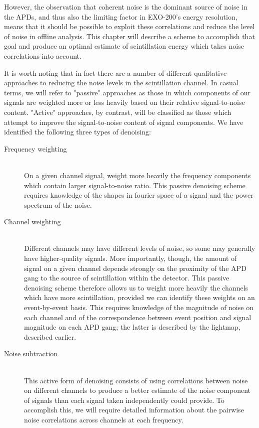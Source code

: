 However, the observation that coherent noise is the dominant source of noise in the APDs, and thus also the limiting factor in EXO-200's energy resolution, means that it should be possible to exploit these correlations and reduce the level of noise in offline analysis.  This chapter will describe a scheme to accomplish that goal and produce an optimal estimate of scintillation energy which takes noise correlations into account.

It is worth noting that in fact there are a number of different qualitative approaches to reducing the noise levels in the scintillation channel.  In casual terms, we will refer to "passive" approaches as those in which components of our signals are weighted more or less heavily based on their relative signal-to-noise content.  "Active" approaches, by contrast, will be classified as those which attempt to improve the signal-to-noise content of signal components.  We have identified the following three types of denoising:
\begin{description}
\item[Frequency weighting] \hfill \\
On a given channel signal, weight more heavily the frequency components which contain larger signal-to-noise ratio.  This passive denoising scheme requires knowledge of the shapes in fourier space of a signal and the power spectrum of the noise.

\item[Channel weighting] \hfill \\
Different channels may have different levels of noise, so some may generally have higher-quality signals.  More importantly, though, the amount of signal on a given channel depends strongly on the proximity of the APD gang to the source of scintillation within the detector.  This passive denoising scheme therefore allows us to weight more heavily the channels which have more scintillation, provided we can identify these weights on an event-by-event basis.  This requires knowledge of the magnitude of noise on each channel and of the correspondence between event position and signal magnitude on each APD gang; the latter is described by the lightmap, described earlier.

\item[Noise subtraction] \hfill \\
This active form of denoising consists of using correlations between noise on different channels to produce a better estimate of the noise component of signals than each signal taken independently could provide.  To accomplish this, we will require detailed information about the pairwise noise correlations across channels at each frequency.
\end{description}

